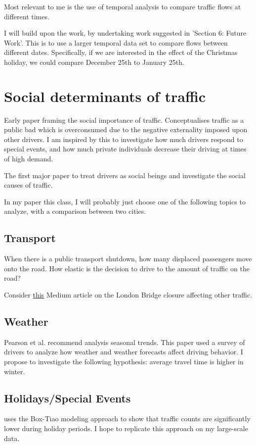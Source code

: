 \documentclass[11pt, oneside]{article}
\begin{document}
\begin{spacing}{2}
Most relevant to me is the use of temporal analysis to compare traffic flows at different times. 

I will build upon the work, by undertaking work suggested in 'Section 6: Future Work'. This is to use a larger temporal data set to compare flows between different dates. Specifically, if we are interested in the effect of the Christmas holiday, we could compare December 25th to January 25th. 

\section{Social determinants of traffic}

\autocite{10.2307/1911814} Early paper framing the social importance of traffic. Conceptualises traffic as a public bad which is overconsumed due to the negative externality imposed upon other drivers. I am inspired by this to investigate how much drivers respond to special events, and how much private individuals decrease their driving at times of high demand.

\autocite{10.1007/3-540-48238-5_28} The first major paper to treat drivers as social beings and investigate the social causes of traffic.

In my paper this class, I will probably just choose one of the following topics to analyze, with a comparison between two cities.

\subsection{Transport}

When there is a public transport shutdown, how many displaced passengers move onto the road. How elastic is the decision to drive to the amount of traffic on the road?

Consider \href{https://medium.com/uber-movement/examining-the-impact-of-the-london-tower-bridge-closure-5b7626e44915?lang=en-US}{this} Medium article on the London Bridge closure affecting other traffic.

\subsection{Weather}

Pearson et al. recommend analysis seasonal trends. This paper \autocite{KILPELAINEN2007288}  used a survey of drivers to analyze how weather and weather forecasts affect driving behavior.
I propose to investigate the following hypothesis: average travel time is higher in winter.

\subsection{Holidays/Special Events}

\autocite{cools2007investigating} uses the Box-Tiao modeling approach to show that traffic counts are significantly lower during holiday periods. I hope to replicate this approach on my large-scale data.

\newpage
\printbibliography

\end{spacing}
\end{document}
